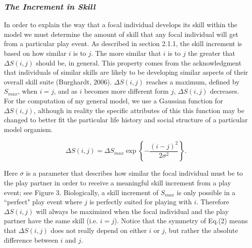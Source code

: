 \documentclass[12pt, letterpaper, fleqn]{article}
\begin{document}
    \subsubsection*{\it The Increment in Skill}
      In order to explain the way that a focal individual develops its skill within the model we must determine the amount of skill that any focal individual will get from a particular play event.
      As described in section 2.1.1, the skill increment is based on how similar $i$ is to $j$.
      The more similar that $i$ is to $j$ the greater that $\Delta S(i,j)$ should be, in general.
      This property comes from the acknowledgment that individuals of similar skills are likely to be developing similar aspects of their overall skill suite (Burghardt, 2006).
      $\Delta S(i,j)$ reaches a maximum, defined by $S_{max}$, when $i=j$, and as $i$ becomes more different form $j$, $\Delta S(i,j)$ decreases.
      For the computation of my general model, we use a Gaussian function for $\Delta S(i,j)$, although in reality the specific attributes of this this function may be changed to better fit the particular life history and social structure of a particular model organism.%
      
      \begin{equation}
      \Delta S(i,j) = \Delta S_{max} \exp\left\{ -  \frac{(i-j)^2}{2\sigma^2}     \right\}.
      \label{sdf}
      \end{equation}
      
      Here $\sigma$ is a parameter that describes how similar the focal individual must be to the play partner in order to receive a meaningful skill increment from a play event; see Figure 3.
      Biologically, a skill increment of $S_{max}$ is only possible in a ``perfect" play event where $j$ is perfectly suited for playing with $i$.
      Therefore $\Delta S(i,j)$ will always be maximized when the focal individual and the play partner have the same skill (i.e. $i = j$).    
      Notice that the symmetry of Eq.(2) means that $\Delta S(i,j)$ does not really depend on either $i$ or $j$, but rather the absolute difference between $i$ and $j$.    
      
\end{document}
